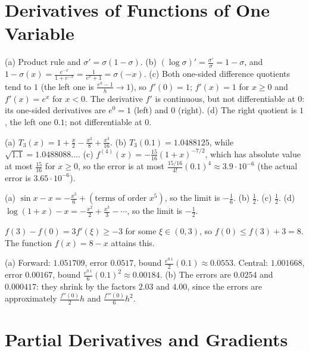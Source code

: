 \documentclass[11pt]{article}
\begin{document}
\section*{Derivatives of Functions of One Variable}

\begin{description}[leftmargin=0pt, itemsep=0.3em]
    \item[\ref{pr:activation-derivs}.] (a) Product rule and $\sigma' = \sigma(1 - \sigma)$. (b) $(\log\sigma)' = \frac{\sigma'}{\sigma} = 1 - \sigma$, and $1 - \sigma(x) = \frac{e^{-x}}{1 + e^{-x}} = \frac{1}{e^x + 1} = \sigma(-x)$. (c) Both one-sided difference quotients tend to $1$ (the left one is $\frac{e^h - 1}{h} \to 1$), so $f'(0) = 1$; $f'(x) = 1$ for $x \geq 0$ and $f'(x) = e^x$ for $x < 0$. The derivative $f'$ is continuous, but not differentiable at $0$: its one-sided derivatives are $e^0 = 1$ (left) and $0$ (right). (d) The right quotient is $1$, the left one $0.1$; not differentiable at $0$.
    \item[\ref{pr:taylor-sqrt}.] (a) $T_3(x) = 1 + \frac{x}{2} - \frac{x^2}{8} + \frac{x^3}{16}$. (b) $T_3(0.1) = 1.0488125$, while $\sqrt{1.1} = 1.0488088\ldots$. (c) $f^{(4)}(x) = -\frac{15}{16}(1 + x)^{-7/2}$, which has absolute value at most $\frac{15}{16}$ for $x \geq 0$, so the error is at most $\frac{15/16}{4!}(0.1)^4 \approx 3.9 \cdot 10^{-6}$ (the actual error is $3.65 \cdot 10^{-6}$).
    \item[\ref{pr:taylor-limits}.] (a) $\sin x - x = -\frac{x^3}{6} + (\text{terms of order } x^5)$, so the limit is $-\frac{1}{6}$. (b) $\frac{1}{2}$. (c) $\frac{1}{2}$. (d) $\log(1 + x) - x = -\frac{x^2}{2} + \frac{x^3}{3} - \cdots$, so the limit is $-\frac{1}{2}$.
    \item[\ref{pr:mvt}.] $f(3) - f(0) = 3f'(\xi) \geq -3$ for some $\xi \in (0, 3)$, so $f(0) \leq f(3) + 3 = 8$. The function $f(x) = 8 - x$ attains this.
    \item[\ref{pr:finite-diff}.] (a) Forward: $1.051709$, error $0.0517$, bound $\frac{e^{0.1}}{2}(0.1) \approx 0.0553$. Central: $1.001668$, error $0.00167$, bound $\frac{e^{0.1}}{6}(0.1)^2 \approx 0.00184$. (b) The errors are $0.0254$ and $0.000417$: they shrink by the factors $2.03$ and $4.00$, since the errors are approximately $\frac{f''(0)}{2}h$ and $\frac{f'''(0)}{6}h^2$.
\end{description}

\section*{Partial Derivatives and Gradients}
\end{document}

